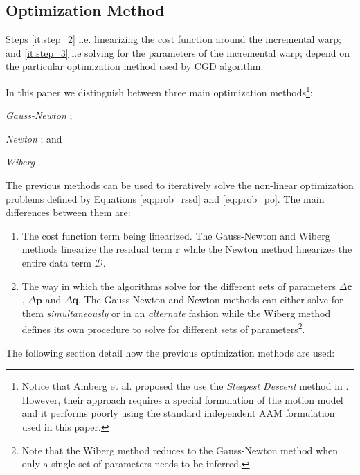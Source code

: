 \subsection{Optimization Method}
\label{sec:optimization}
Steps \ref{it:step_2} i.e. linearizing the cost function around the incremental warp; and \ref{it:step_3} i.e solving for the parameters of the incremental warp; depend on the particular optimization method used by CGD algorithm.

In this paper we distinguish between three main optimization methods\footnote{Notice that Amberg et al. proposed the use the \emph{Steepest Descent} method \cite{Boyd2004} in \cite{Amberg2009}. However, their approach requires a special formulation of the motion model and it performs poorly using the standard independent AAM formulation \cite{Matthews2004} used in this paper.}:
\begin{inparaenum}
    \item \emph{Gauss-Newton} \cite{Boyd2004, Matthews2004, Gross2005, Martins2010, Papandreou2008, Tzimiropoulos2013};
    \item \emph{Newton} \cite{Boyd2004, Kossaifi2014}; and
    \item \emph{Wiberg} \cite{Okatani2006, Strelow2012, Papandreou2008, Tzimiropoulos2013}.
\end{inparaenum}
The previous methods can be used to iteratively solve the non-linear optimization problems defined by Equations \ref{eq:prob_rssd} and \ref{eq:prob_po}. The main differences between them are: 
\begin{enumerate}
    \item The cost function term being linearized. The Gauss-Newton and Wiberg methods linearize the residual term $\mathbf{r}$ while the Newton method linearizes the entire data term $\mathcal{D}$.
    
    \item The way in which the algorithms solve for the different sets of parameters $\Delta \mathbf{c}$, $\Delta \mathbf{p}$ and $\Delta \mathbf{q}$. The Gauss-Newton and Newton methods can either solve for them \emph{simultaneously} or in an \emph{alternate} fashion while the Wiberg method defines its own procedure to solve for different sets of parameters\footnote{Note that the Wiberg method reduces to the Gauss-Newton method when only a single set of parameters needs to be inferred.}.
\end{enumerate}

The following section detail how the previous optimization methods are used:

